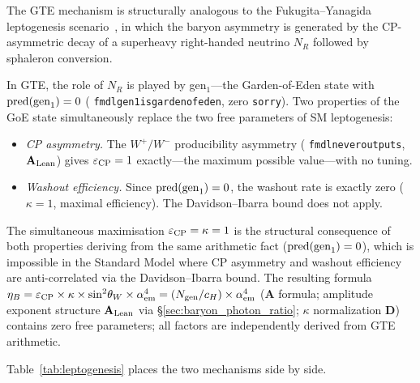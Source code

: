 \documentclass[11pt]{article}
\theoremstyle{remark}
\newcommand{\lean}[1]{%
  \penalty-100
  \begingroup\def\_{\textunderscore\allowbreak}\texttt{#1}\endgroup}
\newcommand{\CatA}{\textbf{A}}
\newcommand{\CatAL}{\ensuremath{\textbf{A}_{\rm Lean}}}
\newcommand{\CatD}{\textbf{D}}
\begin{document}
The GTE mechanism is structurally analogous to the Fukugita--Yanagida leptogenesis
scenario~\cite{Fukugita1986}, in which the baryon asymmetry is generated by the
CP-asymmetric decay of a superheavy right-handed neutrino $N_R$ followed by
sphaleron conversion.

In GTE, the role of $N_R$ is played by gen$_1$---the Garden-of-Eden state with
$\mathrm{pred}({\rm gen}_1) = 0$
(\lean{fmdl\_gen1\_is\_garden\_of\_eden}, zero \texttt{sorry}).
Two properties of the GoE state simultaneously replace the two free parameters
of SM leptogenesis:
\begin{itemize}
\item \emph{CP asymmetry.}  The $W^+\!/W^-$ producibility asymmetry
      (\lean{fmdl\_never\_outputs\_4}, $\CatAL$) gives
      $\varepsilon_{\rm CP} = 1$ exactly---the maximum possible value---with
      no tuning.
\item \emph{Washout efficiency.}  Since $\mathrm{pred}({\rm gen}_1) = 0$,
      the washout rate is exactly zero ($\kappa = 1$, maximal efficiency).
      The Davidson--Ibarra bound does not apply.
\end{itemize}

The simultaneous maximisation $\varepsilon_{\rm CP} = \kappa = 1$ is the structural
consequence of both properties deriving from the same arithmetic fact
($\mathrm{pred}({\rm gen}_1) = 0$), which is impossible in the Standard Model
where CP asymmetry and washout efficiency are anti-correlated via the
Davidson--Ibarra bound.
The resulting formula
$\eta_B = \varepsilon_{\rm CP}\times\kappa\times\sin^2\!\theta_W\times\alpha_{\rm em}^4
= (N_{\rm gen}/c_H)\times\alpha_{\rm em}^4$
($\CatA$ formula; amplitude exponent structure $\CatAL$ via \S\ref{sec:baryon_photon_ratio};
$\kappa$ normalization $\CatD$) contains zero free parameters;
all factors are independently derived from GTE arithmetic.

Table~\ref{tab:leptogenesis} places the two mechanisms side by side.
\end{document}
